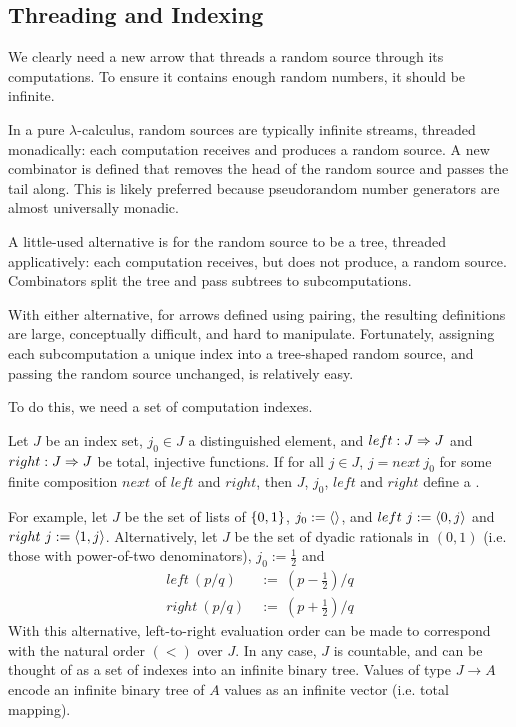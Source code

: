 \documentclass{llncs}
\begin{document}
\subsection{Threading and Indexing}

We clearly need a new arrow that threads a random source through its computations.
To ensure it contains enough random numbers, it should be infinite.

In a pure $\lambda$-calculus, random sources are typically infinite streams, threaded monadically: each computation receives and produces a random source.
A new combinator is defined that removes the head of the random source and passes the tail along.
This is likely preferred because pseudorandom number generators are almost universally monadic.

A little-used alternative is for the random source to be a tree, threaded applicatively:
each computation receives, but does not produce, a random source.
Combinators split the tree and pass subtrees to subcomputations.

With either alternative, for arrows defined using pairing, the resulting definitions are large, conceptually difficult, and hard to manipulate.
Fortunately, assigning each subcomputation a unique index into a tree-shaped random source, and passing the random source unchanged, is relatively easy.

To do this, we need a set of computation indexes.

\begin{definition}
Let $J$ be an index set, $j_0 \in J$ a distinguished element, and $left : J \Rightarrow J$ and $right : J \Rightarrow J$ be total, injective functions. If for all $j \in J$, $j = next~j_0$ for some finite composition $next$ of $left$ and $right$, then $J$, $j_0$, $left$ and $right$ define a .
\end{definition}

For example, let $J$ be the set of lists of $\{{0,1}\}$, $j_0 := \langle{}\rangle$, and $left~j := \langle{0,j}\rangle$ and $right~j := \langle{1,j}\rangle$.
Alternatively, let $J$ be the set of dyadic rationals in $(0,1)$ (i.e. those with power-of-two denominators), $j_0 := \tfrac{1}{2}$ and
\begin{equation}
\begin{aligned}
	left~(p/q) &\ := \ (p-\tfrac{1}{2})/q
\\
	right~(p/q) &\ := \ (p+\tfrac{1}{2})/q
\end{aligned}
\end{equation}
With this alternative, left-to-right evaluation order can be made to correspond with the natural order $(<)$ over $J$.
In any case, $J$ is countable, and can be thought of as a set of indexes into an infinite binary tree.
Values of type $J \to A$ encode an infinite binary tree of $A$ values as an infinite vector (i.e. total mapping).
\end{document}

